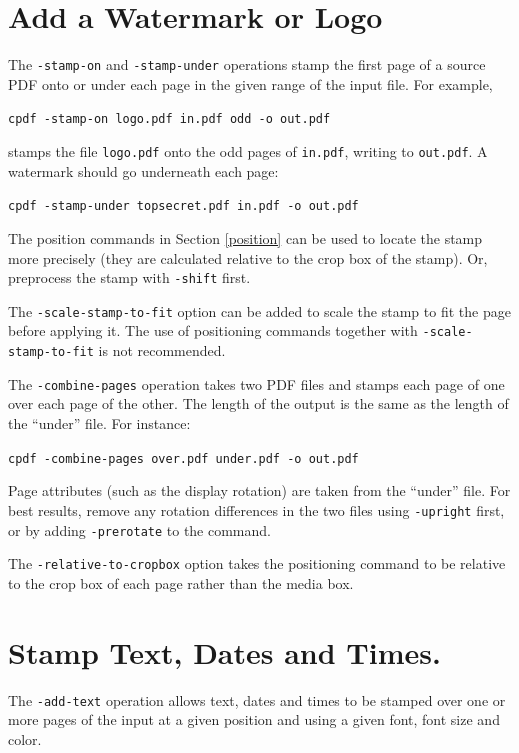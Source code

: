 \documentclass{book}
\begin{document}
  \section{Add a Watermark or Logo}
  The \texttt{-stamp-on} and \texttt{-stamp-under} operations stamp the first
page of a source PDF onto or under each page in the given range of the input
file. For example,

  \begin{framed}
    \noindent\small\verb!cpdf -stamp-on logo.pdf in.pdf odd -o out.pdf!
  \end{framed}

\noindent stamps the file \texttt{logo.pdf} onto the odd pages of \texttt{in.pdf},
writing to \texttt{out.pdf}. A watermark should go underneath each page:

  \begin{framed}
    \noindent\small\verb!cpdf -stamp-under topsecret.pdf in.pdf -o out.pdf!
  \end{framed}

\noindent The position commands in Section \ref{position} can be used to locate the stamp more precisely (they are calculated relative to the crop box of the stamp). Or, preprocess the stamp with \texttt{-shift} first.

The \texttt{-scale-stamp-to-fit} option can be added to scale the stamp to fit the page before applying it. The use of positioning commands together with \texttt{-scale-stamp-to-fit} is not recommended.

  The \texttt{-combine-pages} operation takes two PDF files and stamps each
page of one over each page of the other. The length of the output is the same
as the length of the ``under'' file. For instance:

  \begin{framed}
    \noindent\small\verb!cpdf -combine-pages over.pdf under.pdf -o out.pdf!
  \end{framed}

\noindent Page attributes (such as the display rotation) are taken from the ``under''
file. For best results, remove any rotation differences in the two files using
\texttt{-upright} first, or by adding \texttt{-prerotate} to the command.

The \texttt{-relative-to-cropbox} option takes the positioning command to be relative to the crop box of each page rather than the media box.

  \section{Stamp Text, Dates and Times.}
  The \texttt{-add-text} operation allows text, dates and times to be stamped
over one or more pages of the input at a given position and using a given font,
font size and color.
\end{document}
